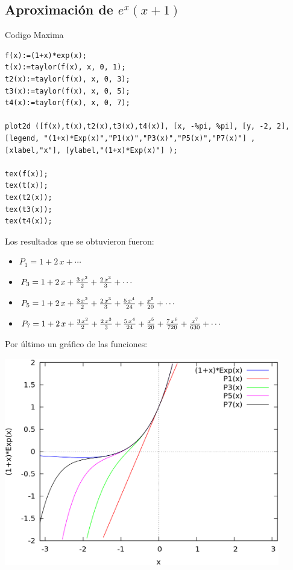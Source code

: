 \documentclass[12pt]{article}
\begin{document}
\subsection{Aproximación de $e^x(x+1)$}
Codigo Maxima
\begin{verbatim}
f(x):=(1+x)*exp(x);
t(x):=taylor(f(x), x, 0, 1);
t2(x):=taylor(f(x), x, 0, 3);
t3(x):=taylor(f(x), x, 0, 5);
t4(x):=taylor(f(x), x, 0, 7);

plot2d ([f(x),t(x),t2(x),t3(x),t4(x)], [x, -%pi, %pi], [y, -2, 2],
[legend, "(1+x)*Exp(x)","P1(x)","P3(x)","P5(x)","P7(x)"] ,
[xlabel,"x"], [ylabel,"(1+x)*Exp(x)"] );

tex(f(x));
tex(t(x));
tex(t2(x));
tex(t3(x));
tex(t4(x));
\end{verbatim}
Los resultados que se obtuvieron fueron:
\begin{itemize}
\item{$P_1= 1+2\,x+\cdots $}
\item{$P_3= 1+2\,x+{{3\,x^2}\over{2}}+{{2\,x^3}\over{3}}+\cdots $}
\item{$P_5= 1+2\,x+{{3\,x^2}\over{2}}+{{2\,x^3}\over{3}}+{{5\,x^4}\over{24}}+{{x^5}\over{20}}+\cdots $}
\item{$P_7= 1+2\,x+{{3\,x^2}\over{2}}+{{2\,x^3}\over{3}}+{{5\,x^4}\over{24}}+{{x^5}\over{20}}+{{7\,x^6}\over{720}}+{{x^7}\over{630}}+\cdots $}
\end{itemize}
Por último un gráfico de las funciones:
\begin{center}
\includegraphics[width=12cm]{Taylor(1+x)Exp(x)}
\end{center}
\end{document}

